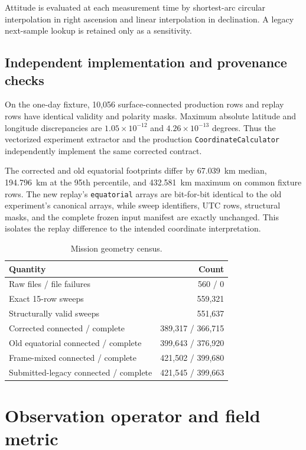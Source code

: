 \documentclass[11pt]{article}
\begin{document}
Attitude is evaluated at each measurement time by shortest-arc circular
interpolation in right ascension and linear interpolation in declination.  A
legacy next-sample lookup is retained only as a sensitivity.

\subsection{Independent implementation and provenance checks}

On the one-day fixture, 10,056 surface-connected production rows and replay
rows have identical validity and polarity masks.  Maximum absolute latitude
and longitude discrepancies are $1.05\times10^{-12}$ and
$4.26\times10^{-13}$ degrees.  Thus the vectorized experiment extractor and
the production \texttt{CoordinateCalculator} independently implement the same
corrected contract.

The corrected and old equatorial footprints differ by 67.039~km median,
194.796~km at the 95th percentile, and 432.581~km maximum on common fixture
rows.  The new replay's \texttt{equatorial} arrays are bit-for-bit identical
to the old experiment's canonical arrays, while sweep identifiers, UTC rows,
structural masks, and the complete frozen input manifest are exactly
unchanged.  This isolates the replay difference to the intended coordinate
interpretation.

\begin{table}[ht]
\centering
\caption{Mission geometry census.}
\label{tab:census}
\begin{tabular}{lr}
\toprule
Quantity & Count \\
\midrule
Raw files / file failures & 560 / 0 \\
Exact 15-row sweeps & 559,321 \\
Structurally valid sweeps & 551,637 \\
Corrected connected / complete & 389,317 / 366,715 \\
Old equatorial connected / complete & 399,643 / 376,920 \\
Frame-mixed connected / complete & 421,502 / 399,680 \\
Submitted-legacy connected / complete & 421,545 / 399,663 \\
\bottomrule
\end{tabular}
\end{table}

\section{Observation operator and field metric}
\end{document}
